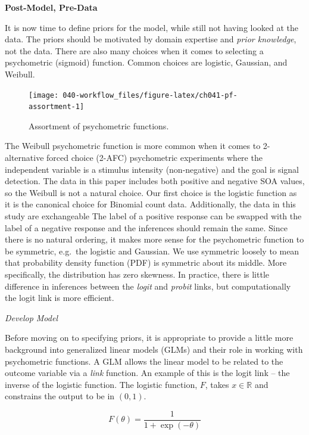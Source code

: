 \documentclass[11pt, oneside, openany]{scrbook}
\begin{document}
\textbf{Post-Model, Pre-Data}

It is now time to define priors for the model, while still not having looked at the data. The priors should be motivated by domain expertise and \emph{prior knowledge}, not the data. There are also many choices when it comes to selecting a psychometric (sigmoid) function. Common choices are logistic, Gaussian, and Weibull.

\begin{figure}

{\centering \texttt{[image: 040-workflow\_files/figure-latex/ch041-pf-assortment-1]} 

}

\caption{Assortment of psychometric functions.}\label{fig:ch041-pf-assortment}
\end{figure}

The Weibull psychometric function is more common when it comes to 2-alternative forced choice (2-AFC) psychometric experiments where the independent variable is a stimulus intensity (non-negative) and the goal is signal detection. The data in this paper includes both positive and negative SOA values, so the Weibull is not a natural choice. Our first choice is the logistic function as it is the canonical choice for Binomial count data. Additionally, the data in this study are exchangeable The label of a positive response can be swapped with the label of a negative response and the inferences should remain the same. Since there is no natural ordering, it makes more sense for the psychometric function to be symmetric, e.g.~the logistic and Gaussian. We use symmetric loosely to mean that probability density function (PDF) is symmetric about its middle. More specifically, the distribution has zero skewness. In practice, there is little difference in inferences between the \emph{logit} and \emph{probit} links, but computationally the logit link is more efficient.

\emph{Develop Model}

Before moving on to specifying priors, it is appropriate to provide a little more background into generalized linear models (GLMs) and their role in working with psychometric functions. A GLM allows the linear model to be related to the outcome variable via a \emph{link} function. An example of this is the logit link -- the inverse of the logistic function. The logistic function, \(F\), takes \(x \in \mathbb{R}\) and constrains the output to be in \((0, 1)\).

\begin{equation}
  F(\theta) = \frac{1}{1 + \exp\left(-\theta\right)}
  \label{eq:logistic}
\end{equation}
\end{document}
